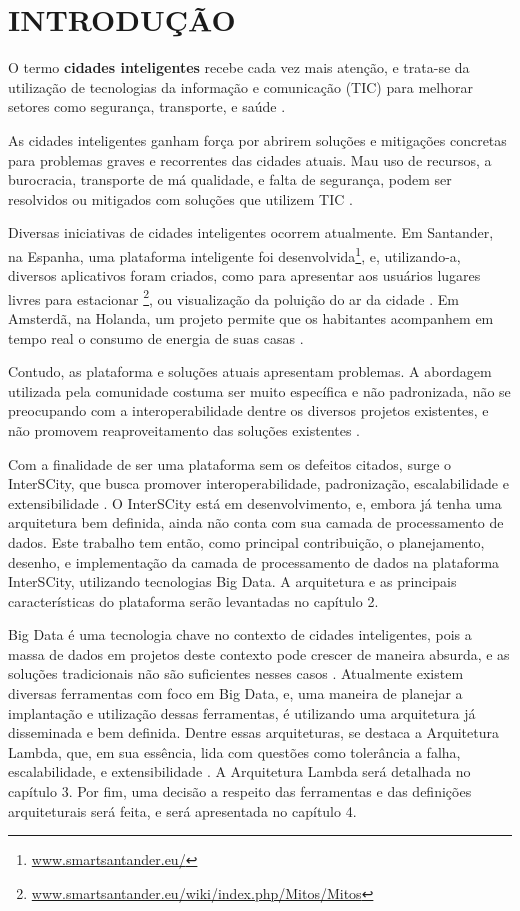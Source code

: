 \chapter[INTRODUÇÃO]{INTRODUÇÃO}

O termo \textbf{cidades inteligentes} recebe cada vez mais atenção, e trata-se
da utilização de tecnologias da informação e comunicação (TIC) para melhorar
setores como segurança, transporte, e saúde \cite{batty2012smart}.

As cidades inteligentes ganham força por abrirem soluções e mitigações
concretas para problemas graves e recorrentes das cidades atuais. Mau uso de
recursos, a burocracia, transporte de má qualidade, e falta de segurança,
podem ser resolvidos ou mitigados com soluções que utilizem
TIC \cite{batty2012smart}.

Diversas iniciativas de cidades inteligentes ocorrem atualmente. Em Santander,
na Espanha, uma plataforma inteligente foi
desenvolvida\footnote{\url{www.smartsantander.eu/}}, e, utilizando-a,
diversos aplicativos foram criados, como para apresentar aos usuários lugares
livres para estacionar
\footnote{\url{www.smartsantander.eu/wiki/index.php/Mitos/Mitos}}, ou visualização
da poluição do ar da cidade \cite{santana2016software}. Em Amsterdã, na Holanda,
um projeto permite que os habitantes acompanhem em tempo real o consumo de
energia de suas casas \cite{kon2016}.

Contudo, as plataforma e soluções atuais apresentam problemas. A abordagem
utilizada pela comunidade costuma ser muito específica e não padronizada, não
se preocupando com a interoperabilidade dentre os diversos projetos existentes,
e não promovem reaproveitamento das soluções existentes \cite{delesposte2017}.

Com a finalidade de ser uma plataforma sem os defeitos citados, surge o
InterSCity, que busca promover interoperabilidade, padronização,
escalabilidade e extensibilidade \cite{delesposte2017}. O InterSCity está em
desenvolvimento, e, embora já tenha uma arquitetura bem definida, ainda não
conta com sua camada de processamento de dados. Este trabalho tem então, como
principal contribuição, o planejamento, desenho, e implementação da camada de
processamento de dados na plataforma InterSCity, utilizando tecnologias Big
Data. A arquitetura e as principais características do plataforma serão
levantadas no capítulo 2.

Big Data é uma tecnologia chave no contexto de cidades inteligentes, pois a
massa de dados em projetos deste contexto pode crescer de maneira
absurda, e as soluções tradicionais não são suficientes nesses
casos \cite{batty2012smart}. Atualmente existem diversas ferramentas com foco
em Big Data, e, uma maneira de planejar a implantação e utilização dessas
ferramentas, é utilizando uma arquitetura já disseminada e bem definida. Dentre
essas arquiteturas, se destaca a Arquitetura Lambda, que, em sua essência, lida
com questões como tolerância a falha, escalabilidade, e
extensibilidade \cite{marz2015}. A Arquitetura Lambda será detalhada no
capítulo 3. Por fim, uma decisão a respeito das ferramentas e das definições
arquiteturais será feita, e será apresentada no capítulo 4.

